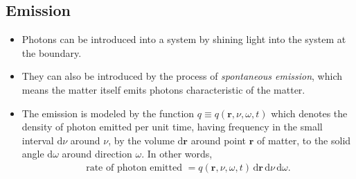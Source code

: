 \documentclass[10pt]{article}
\newcommand{\dee}{\mathrm{d}}
\newcommand{\ve}[1]{\mathbf{#1}}
\begin{document}
  \subsection{Emission}
  \begin{itemize}
    \item Photons can be introduced into a system by shining light into the system at the boundary.

    \item They can also be introduced by the process of \emph{spontaneous emission}, which means the matter itself emits photons characteristic of the matter.

    \item The emission is modeled by the function $q \equiv q(\ve{r}, \nu, \omega, t)$ which denotes the density of photon emitted per unit time, having frequency in the small interval $\dee \nu$ around $\nu$, by the volume $\dee \ve{r}$ around point $\ve{r}$ of matter, to the solid angle $\dee \omega$ around direction $\omega$. In other words,
    \begin{align*}
      \mbox{rate of photon emitted } = q(\ve{r}, \nu, \omega, t)\, \dee \ve{r}\, \dee \nu \, \dee \omega.
    \end{align*}
  \end{itemize}
\end{document}
